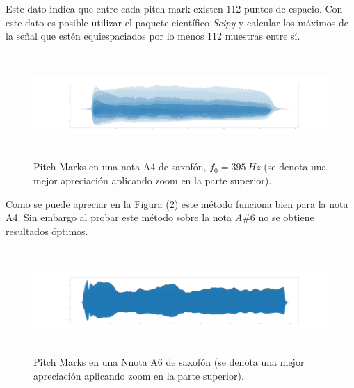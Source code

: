 Este dato indica que entre cada pitch-mark existen 112 puntos de espacio. Con este dato es posible utilizar el paquete científico \textit{Scipy} y calcular los máximos de la señal que estén equiespaciados por lo menos 112 muestras entre sí.
\begin{figure}[H]
	\centering
	\includegraphics[width=\linewidth,height=150px]{ImagenesEjercicio5/noteA4}
	\caption{Pitch Marks en una nota A4 de saxofón, $f_0 = 395 \ Hz$ (se denota una mejor apreciación aplicando zoom en la parte superior).}
	\label{fig:pmsnotea4}
\end{figure}

Como se puede apreciar en la Figura (\ref{fig:pmsnotea4}) este método funciona bien para la nota A4. Sin embargo al probar este método sobre la nota $A\#6$ no se obtiene resultados óptimos.
\begin{figure}[H]
	\centering
	\includegraphics[width=\linewidth,height=150px]{ImagenesEjercicio5/Asharp6.png}
	\caption{Pitch Marks en una Nnota A6 de saxofón (se denota una mejor apreciación aplicando zoom en la parte superior).}
	\label{fig:pmsnotea4}
\end{figure}